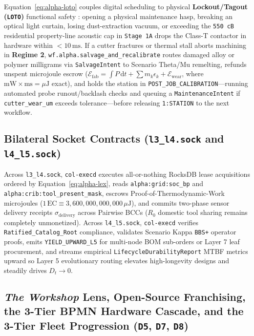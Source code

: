 Equation~\eqref{eq:alpha-loto} couples digital scheduling to physical \textbf{Lockout/Tagout
(\texttt{LOTO})} functional safety \parencite{iec61508}: opening a physical maintenance
hasp, breaking an optical light curtain, losing dust-extraction vacuum, or exceeding the
\texttt{550 cB} residential property-line acoustic cap in \texttt{Stage 1A} drops the Class-T
contactor in hardware within $< 10\,\mathrm{ms}$. If a cutter fractures or thermal stall
aborts machining in \textbf{Regime 2}, \texttt{wf.alpha.salvage\_and\_recalibrate} routes
damaged alloy or polymer milligrams via \texttt{SalvageIntent} to Scenario Theta/Mu
remelting, refunds unspent microjoule escrow ($\mathcal{E}_{\mathrm{fab}} = \int P\,\mathrm{d}t + \sum m_k \epsilon_k + \mathcal{E}_{\mathrm{wear}}$,
where $\mathrm{mW} \times \mathrm{ms} = \mu\mathrm{J}$ exact), and holds the station in
\texttt{POST\_JOB\_CALIBRATION}---running automated probe runout/backlash checks and queuing a
\texttt{MaintenanceIntent} if \texttt{cutter\_wear\_um} exceeds tolerance---before releasing
\texttt{1:STATION} to the next workflow.

\subsection{Bilateral Socket Contracts (\texttt{l3\_l4.sock} and \texttt{l4\_l5.sock})}

Across \texttt{l3\_l4.sock}, \texttt{col-execd} executes all-or-nothing RocksDB lease
acquisitions ordered by Equation~\eqref{eq:alpha-lex}, reads \texttt{alpha:grid:soc\_bp} and
\texttt{alpha:crib:tool\_present\_mask}, escrows Proof-of-Thermodynamic-Work microjoules
($1\,\mathrm{EC} \equiv 3{,}600{,}000{,}000{,}000\,\mu\mathrm{J}$), and commits two-phase
sensor delivery receipts $\sigma_{\mathrm{delivery}}$ across Pairwise BCCs ($R_0$ domestic
tool sharing remains completely unmonetized). Across \texttt{l4\_l5.sock}, \texttt{col-execd}
verifies \texttt{Ratified\_Catalog\_Root} compliance, validates Scenario Kappa \texttt{BBS+}
operator proofs, emits \texttt{YIELD\_UPWARD\_L5} for multi-node BOM sub-orders or Layer 7
leaf procurement, and streams empirical \texttt{LifecycleDurabilityReport} MTBF metrics
upward so Layer 5 evolutionary routing elevates high-longevity designs and steadily drives
$D_t \to 0$.

\subsection{\emph{The Workshop} Lens, Open-Source Franchising, the 3-Tier BPMN Hardware Cascade, and the 3-Tier Fleet Progression (\texttt{D5}, \texttt{D7}, \texttt{D8})}
\label{sec:alpha-franchising-cascade-fleet}

